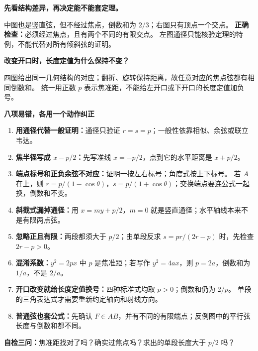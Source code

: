\clearpage
\begin{trapbox}
\textbf{先看结构差异，再决定能不能套定理。}
\begin{center}\end{center}
中图也是竖直弦，但不经过焦点，倒数和为 $2/3$；右图只有顶点一个交点。
\textbf{正确检查：}必须经过焦点，且有两个不同的有限交点。
左图通径只能核验定理的特例，不能代替对所有倾斜弦的证明。
\end{trapbox}

\clearpage
\begin{trapbox}
\textbf{改变开口时，长度定值为什么保持不变？}
\begin{center}\end{center}
四图给出同一几何结构的对应；翻折、旋转保持距离，故任意对应的焦点弦都有相同倒数和。
统一用正数 $p$ 表示焦准距，不能给左开口或下开口的长度定值加负号。
\end{trapbox}

\clearpage
\begin{trapbox}
\textbf{八项易错，各用一个动作纠正}
\begin{enumerate}[leftmargin=*,itemsep=.65em]
\item \textbf{用通径代替一般证明：}通径只验证 $r=s=p$；一般性依靠相似、余弦或联立韦达。
\item \textbf{焦半径写成 $x-p/2$：}先写准线 $x=-p/2$，点到它的水平距离是 $x+p/2$。
\item \textbf{端点标号和正负余弦不对应：}证明一按左右标号；角度式按上下标号。
若 $A$ 在上，则 $r=p/(1-\cos\theta)$，$s=p/(1+\cos\theta)$；交换端点要连公式一起换，倒数和不变。
\item \textbf{斜截式漏掉通径：}用 $x=my+p/2$，$m=0$ 就是竖直通径；水平轴线本来不是有限两点弦。
\item \textbf{忽略正且有限：}两段都须大于 $p/2$；由单段反求 $s=pr/(2r-p)$ 时，先检查 $2r-p>0$。
\item \textbf{混淆系数：}$y^2=2px$ 中 $p$ 是焦准距；若写作 $y^2=4ax$，则 $p=2a$，倒数和为 $1/a$，不是 $2/a$。
\item \textbf{开口改变就给长度定值换号：}四种标准式均取 $p>0$；倒数和仍为 $2/p$。
单段的三角表达式才需要重新约定轴向和射线方向。
\item \textbf{普通弦也套公式：}先确认 $F\in AB$，并有不同的有限端点；反例图中的平行弦长度与倒数和都不同。
\end{enumerate}
\textbf{自检三问：}焦准距找对了吗？确实过焦点吗？求出的单段长度大于 $p/2$ 吗？
\end{trapbox}
